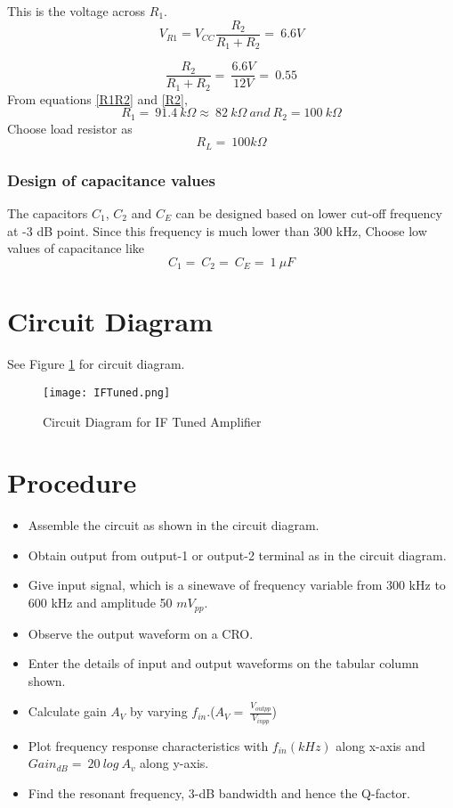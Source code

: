 \noindent This is the voltage across $R_1$. 
\begin{equation}
V_{R1}= V_{CC} \frac{R_2}{R_1+R_2}=\ 6.6V
\end{equation}

\begin{equation}
\label{R2}
\frac{R_2}{R_1+R_2}=\ \frac{6.6V}{12V}=\ 0.55
\end{equation}
From equations \ref{R1R2} and \ref{R2}, 
\begin{equation}
R_1=\ 91.4\ k\Omega \approx \ 82\ k\Omega \ and \ R_2=100\ k\Omega
\end{equation}
\noindent Choose load resistor as 
\begin{equation}
R_L=\ 100 k\Omega
\end{equation}
\subsubsection{Design of capacitance values}
\noindent The capacitors $C_1$, $C_2$  and $C_E$  can be designed based on lower cut-off frequency at -3 dB point. Since this frequency is much lower than 300 kHz, Choose low values of capacitance like \begin{equation}
C_1=\ C_2=\ C_E=\ 1 \ \mu F
\end{equation}

\section*{Circuit Diagram}
See Figure \ref{IFTuned} for circuit diagram.
\begin{figure}[ht]
\texttt{[image: IFTuned.png]}
\caption{Circuit Diagram for IF Tuned Amplifier}
\label{IFTuned}
\end{figure}
\section*{Procedure}
\begin{itemize}
\item
Assemble the circuit as shown in the circuit diagram.
\item
Obtain output from output-1 or output-2 terminal as in the circuit diagram.
\item
Give input signal, which is a sinewave of frequency variable from 300 kHz to 600 kHz and amplitude 50 $mV_{pp}$.
\item
Observe the output waveform on a CRO. 
\item
Enter the details of input and output waveforms on the tabular column shown.
\item
Calculate gain $A_V$ by varying $f_{in}$.($A_V= \ \frac{V_{outpp}}{V_{inpp}}$)

\item
Plot frequency response characteristics with $f_{in} (kHz) $ along x-axis and  $Gain_{dB}=\ 20\ log\ A_v$ along y-axis.
\item
Find the resonant frequency, 3-dB bandwidth and hence the Q-factor.
\end{itemize}
